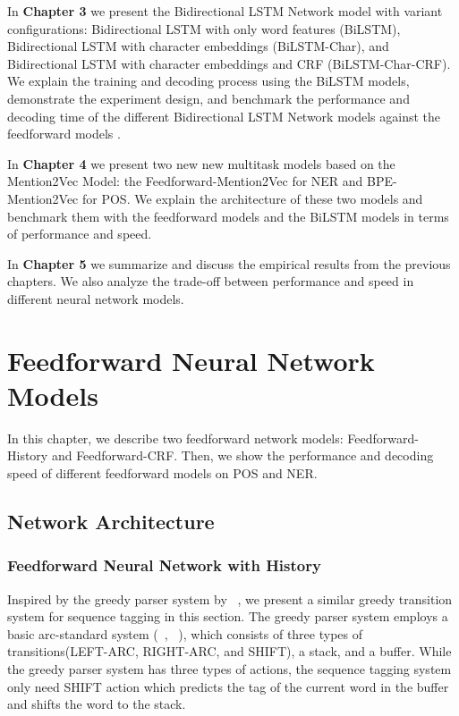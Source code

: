 \documentclass{sfuthesis}
\begin{document}
In \textbf{Chapter 3} we present the Bidirectional LSTM Network model with variant configurations: Bidirectional LSTM with only word features (BiLSTM), Bidirectional LSTM with character embeddings (BiLSTM-Char), and Bidirectional LSTM with character embeddings and CRF (BiLSTM-Char-CRF). We explain the training and decoding process using the BiLSTM models, demonstrate the experiment design, and benchmark the performance and decoding time of the different Bidirectional LSTM Network models against the feedforward models .

In \textbf{Chapter 4} we present two new new multitask models based on the Mention2Vec Model: the Feedforward-Mention2Vec for NER and BPE-Mention2Vec for POS. We explain the architecture of these two models and benchmark them with the feedforward models and the BiLSTM models in terms of performance and speed.

In \textbf{Chapter 5} we summarize and discuss the empirical results from the previous chapters. We also analyze the trade-off between performance and speed in different neural network models.


\chapter{Feedforward Neural Network Models}

In this chapter, we describe two feedforward network models: Feedforward-History and Feedforward-CRF. Then, we show the performance and decoding speed of different feedforward models on POS and NER. 

\section{Network Architecture}

\subsection{Feedforward Neural Network with History}

Inspired by the greedy parser system by ~\cite{chen2014fast}, we present a similar greedy transition system for sequence tagging in this section. The greedy parser system employs a basic arc-standard system (~\citeauthor{nivre2004deterministic}, ~\citeyear{nivre2004deterministic}), which consists of three types of transitions(LEFT-ARC, RIGHT-ARC, and SHIFT), a stack, and a buffer. While the greedy parser system has three types of actions, the sequence tagging system only need SHIFT action which predicts the tag of the current word in the buffer and shifts the word to the stack. 
\end{document}
